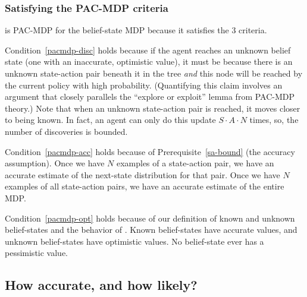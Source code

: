 \subsubsection{Satisfying the PAC-MDP criteria}

 is PAC-MDP for the belief-state MDP because it satisfies the 3 criteria.

Condition~\ref{pacmdp-disc} holds because if the agent reaches an unknown belief state (one with an inaccurate, optimistic value), it must be because there is an unknown state-action pair beneath it in the tree \emph{and} this node will be reached by the current policy with high probability.  (Quantifying this claim involves an argument that closely parallels the ``explore or exploit'' lemma from PAC-MDP theory.)  Note that when an unknown state-action pair is reached, it moves closer to being known.  In fact, an agent can only do this update $S\cdot A \cdot N$ times, so, the number of discoveries is bounded.


Condition~\ref{pacmdp-acc} holds because of Prerequisite~\ref{sa-bound} (the accuracy assumption). Once we have $N$ examples of a state-action pair, we have an accurate estimate of the next-state distribution for that pair. Once we have $N$ examples of all state-action pairs, we have an accurate estimate of the entire MDP.


Condition~\ref{pacmdp-opt} holds because of our definition of known and unknown belief-states and the behavior of . Known belief-states have accurate values, and unknown belief-states have optimistic values. No belief-state ever has a pessimistic value.

\subsection{How accurate, and how likely?}

